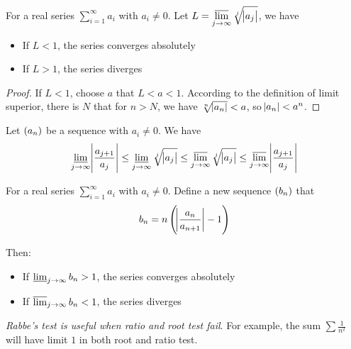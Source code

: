 \begin{theorem}
    For a real series $\sum_{i=1}^\infty a_i$ with $a_i \neq 0$. Let $\displaystyle L = \varlimsup_{j \rightarrow \infty}  \sqrt[j]{\abs{a_j}}$, we have
    \begin{itemize}
        \item If $L < 1$, the series converges absolutely
        \item If $L > 1$, the series diverges
    \end{itemize}
\end{theorem}
\begin{proof}
    If $L < 1$, choose $a$ that $L < a < 1$. According to the definition of limit superior, there is $N$ that for $n > N$, we have $\sqrt[n]{\abs{a_n}} < a$, so $\abs{a_n} < a^n$.
\end{proof}

\begin{theorem}
    Let $\sequence{a_n}$ be a sequence with $a_i \neq 0$. We have
    \begin{equation}
        \varliminf_{j \rightarrow \infty} \abs{\frac{a_{j+1}}{a_j}} \leq \varliminf_{j \rightarrow \infty}  \sqrt[j]{\abs{a_j}} \leq \varlimsup_{j \rightarrow \infty}  \sqrt[j]{\abs{a_j}} \leq \varlimsup_{j \rightarrow \infty} \abs{\frac{a_{j+1}}{a_j}}
    \end{equation}
\end{theorem}


\begin{theorem}
    For a real series $\sum_{i=1}^\infty a_i$ with $a_i \neq 0$. Define a new sequence $\sequence{b_n}$ that
    \begin{equation}
        b_n = n \left( \abs{\frac{a_n}{a_{n+1}}} - 1 \right)
    \end{equation}
    
    Then:
    \begin{itemize}
        \item If $\varliminf_{j \rightarrow \infty} b_n > 1$, the series converges absolutely
        \item If $\varlimsup_{j \rightarrow \infty} b_n < 1$, the series diverges
    \end{itemize}
    
    \emph{Rabbe's test is useful when ratio and root test fail}. For example, the sum $\sum \frac{1}{n^2}$ will have limit $1$ in both root and ratio test.
\end{theorem}



